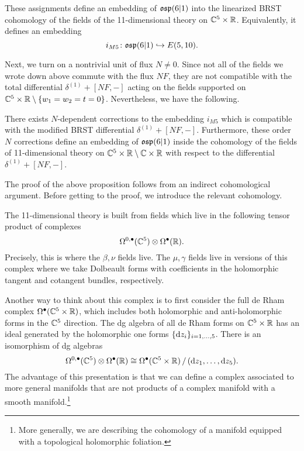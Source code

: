 \begin{lem}
These assignments define an embedding of $\mathfrak{osp}(6|1)$ into the linearized BRST cohomology of the fields of the 11-dimensional theory on $\mathbb C^5 \times \mathbb R$. 
Equivalently, it defines an embedding
\[
i_{M5} \colon \mathfrak{osp}(6|1) \hookrightarrow E(5,10) .
\]
\end{lem} 

\parsec[]

Next, we turn on a nontrivial unit of flux $N \ne 0$. 
Since not all of the fields we wrote down above commute with the flux $N F$, they are not compatible with the total differential $\delta^{(1)} + [N F, -]$ acting on the fields supported on $\mathbb C^5 \times \mathbb R \setminus \{w_1=w_2=t=0\}$. 
Nevertheless, we have the following.

\begin{prop}
\label{prop:brads7}
There exists $N$-dependent corrections to the embedding $i_{M5}$ which is compatible with the modified BRST differential $\delta^{(1)} + [N F,-]$. 
Furthermore, these order $N$ corrections define an embedding of $\mathfrak{osp}(6|1)$ inside the cohomology of the fields of 11-dimensional theory on $\mathbb C^5 \times \mathbb R \setminus \mathbb C \times \mathbb R$ with respect to the differential $\delta^{(1)} + [N  F,-]$.
\end{prop}

\parsec[s:thfcohomology]

The proof of the above proposition follows from an indirect cohomological argument. 
Before getting to the proof, we introduce the relevant cohomology. 

The 11-dimensional theory is built from fields which live in the following tensor product of complexes 
\[
\Omega^{0,\bullet}(\mathbb C^5) \otimes \Omega^\bullet(\mathbb R).
\]
Precisely, this is where the $\beta,\nu$ fields live. 
The $\mu,\gamma$ fields live in versions of this complex where we take Dolbeault forms with coefficients in the holomorphic tangent and cotangent bundles, respectively. 

Another way to think about this complex is to first consider the full de Rham complex $\Omega^\bullet(\mathbb C^5 \times \mathbb R)$, which includes both holomorphic and anti-holomorphic forms in the $\mathbb C^5$ direction. 
The dg algebra of all de Rham forms on $\mathbb C^5 \times \mathbb R$ has an ideal generated by the holomorphic one forms $\{{\rm d} z_i\}_{i=1,\ldots,5}$.
There is an isomorphism of dg algebras
\[
\Omega^{0,\bullet}(\mathbb C^5) \otimes \Omega^\bullet(\mathbb R) \cong \Omega^\bullet(\mathbb C^5 \times \mathbb R) \, / \, ({\rm d} z_1,\ldots, {\rm d} z_5) .
\]
The advantage of this presentation is that we can define a complex associated to more general manifolds that are not products of a complex manifold with a smooth manifold.\footnote{More generally, we are describing the cohomology of a manifold equipped with a topological holomorphic foliation.}

